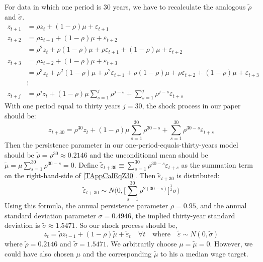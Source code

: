 \documentclass[letterpaper,12pt]{article}
\theoremstyle{definition}
\newcommand\ve{\varepsilon}
\begin{document}
  For data in which one period is 30 years, we have to recalculate the analogous $\tilde{\rho}$ and $\tilde{\sigma}$.
  \begin{equation*}\label{TAppCalEqZtpj}
    \begin{split}
      z_{t+1} &= \rho z_{t} + (1-\rho)\mu + \ve_{t+1} \\
      z_{t+2} &= \rho z_{t+1} + (1-\rho)\mu + \ve_{t+2} \\
              &= \rho^2 z_{t} + \rho(1-\rho)\mu + \rho\ve_{t+1} + (1-\rho)\mu + \ve_{t+2} \\
      z_{t+3} &= \rho z_{t+2} + (1-\rho)\mu + \ve_{t+3} \\
              &= \rho^3 z_{t} + \rho^2(1-\rho)\mu + \rho^2\ve_{t+1} + \rho(1-\rho)\mu + \rho\ve_{t+2} + (1-\rho)\mu + \ve_{t+3} \\
              &\vdots \\
      z_{t+j} &= \rho^{j}z_{t} + (1-\rho)\mu\sum_{s=1}^{j}\rho^{j-s} + \sum_{s=1}^{j}\rho^{j-s}\ve_{t+s}
    \end{split}
  \end{equation*}
  With one period equal to thirty years $j=30$, the shock process in our paper should be:
  \begin{equation}\label{TAppCalEqZ30}
    z_{t+30} = \rho^{30}z_{t} + (1-\rho)\mu\sum_{s=1}^{30}\rho^{30-s} + \sum_{s=1}^{30}\rho^{30-s}\ve_{t+s}
  \end{equation}
  Then the persistence parameter in our one-period-equals-thirty-years model should be $\tilde{\rho}=\rho^{30}\approx 0.2146$ and the unconditional mean should be $\tilde{\mu} = \mu\sum_{s=1}^{30}\rho^{30-s}=0$. Define $\tilde{\ve}_{t+30}\equiv\sum_{s=1}^{30}\rho^{30-s}\ve_{t+s}$ as the summation term on the right-hand-side of \eqref{TAppCalEqZ30}. Then $\tilde{\ve}_{t+30}$ is distributed:
  \begin{equation*}\label{TAppCalEqEps30dist}
    \tilde{\ve}_{t+30}\sim N\Biggl(0,\biggl[\sum_{s=1}^{30}\rho^{2(30-s)}\biggr]^\frac{1}{2}\sigma\Biggr)
  \end{equation*}
  Using this formula, the annual persistence parameter $\rho=0.95$, and the annual standard deviation parameter $\sigma=0.4946$, the implied thirty-year standard deviation is $\tilde{\sigma}\approx 1.5471$. So our shock process should be,
  \begin{equation*}\label{TAppCalEqZ30cal}
    z_t = \tilde{\rho}z_{t-1} + (1-\rho)\tilde{\mu} + \tilde{\ve}_t \quad\forall t \quad\text{where}\quad \tilde{\ve}\sim N(0,\tilde{\sigma})
  \end{equation*}
  where $\tilde{\rho}=0.2146$ and $\tilde{\sigma}=1.5471$. We arbitrarily choose $\mu=\tilde{\mu}=0$. However, we could have also chosen $\mu$ and the corresponding $\tilde{\mu}$ to his a median wage target.
\end{document}
